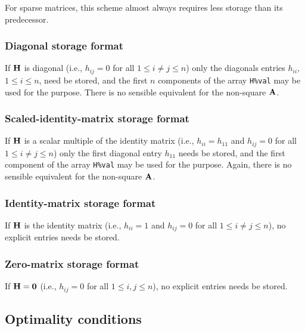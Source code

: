 \documentclass{galahad}
\begin{document}
For sparse matrices, this scheme almost always requires less storage than
its predecessor.

\subsubsection{Diagonal storage format}\label{diagonal}
If ${\mathbf{H}}$ is diagonal (i.e., $h_{ij} = 0$ for all $1 \leq i \neq j \leq n$)
only the diagonals entries $h_{ii}$, $1 \leq i \leq n$,  need be stored,
and the first $n$ components of the array {\tt H\%val} may be used for
the purpose. There is no sensible equivalent for the non-square ${\mathbf{A}}$.

\subsubsection{Scaled-identity-matrix storage format}\label{scaled-identity}
If ${\mathbf{H}}$ is a scalar multiple of the identity matrix
(i.e., $h_{ii} = h_{11}$  and $h_{ij} = 0$ for all $1 \leq i \neq j \leq n$)
only the first diagonal entry $h_{11}$ needs be stored,
and the first component of the array {\tt H\%val} may be used for
the purpose. Again, there is no sensible equivalent for the non-square ${\mathbf{A}}$.

\subsubsection{Identity-matrix storage format}\label{identity}
If ${\mathbf{H}}$ is the identity matrix
(i.e., $h_{ii} = 1$ and $h_{ij} = 0$ for all $1 \leq i \neq j \leq n$),
no explicit entries needs be stored.

\subsubsection{Zero-matrix storage format}\label{zero}
If ${\mathbf{H}} = {\mathbf{0}}$ (i.e., $h_{ij} = 0$ for all $1 \leq i, j \leq n$),
no explicit entries needs be stored.


\subsection{Optimality conditions\label{galopt}}
\end{document}
